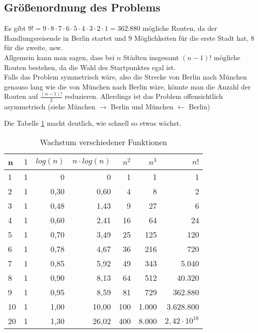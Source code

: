 \documentclass[a4paper,9pt]{scrartcl}
\begin{document}
  \subsection{Größenordnung des Problems}
    Es gibt $9! = 9 \cdot 8 \cdot 7 \cdot 6 \cdot 5 \cdot 4 \cdot 3 \cdot 2 \cdot 1 = 362.880$ mögliche Routen,
    da der Handlungsreisende in Berlin startet und 9 Möglichkeiten für die erste
    Stadt hat, 8 für die zweite, usw.\\
    Allgemein kann man sagen, dass bei $n$ Städten insgesamt $(n-1)!$ mögliche
    Routen bestehen, da die Wahl des Startpunktes egal ist. \\
    Falls das  Problem symmetrisch wäre, also die Strecke von Berlin nach
    München genauso lang wie die von München nach Berlin wäre, könnte man die
    Anzahl der Routen auf $\frac{(n-1)!}{2}$ reduzieren. Allerdings ist das
    Problem offensichtlich asymmetrisch (siehe München $\rightarrow$ Berlin und
    München $\leftarrow$ Berlin)

    Die Tabelle \ref{tab:functionGrowth} macht deutlich, wie schnell so etwas
    wächst.
    \begin{table}[hc]
        \centering
        \begin{tabular}[hc]{|l|r|r|r|r|r|r|}
          \hline
          n         & $1$   & $log(n)$  & $n \cdot log(n)$  & $n^2$ & $n^3$ & $n!$  \\
          \hline\hline
          1         & 1     & 0         & 0                 & 1     &   1   & 1     \\
          2         & 1     & 0,30      & 0,60              & 4     &   8   & 2     \\
          3         & 1     & 0,48      & 1,43              & 9     &   27  & 6     \\
          4         & 1     & 0,60      & 2,41              & 16    &   64  & 24    \\
          5         & 1     & 0,70      & 3,49              & 25    &   125 & 120   \\
          6         & 1     & 0,78      & 4,67              & 36    &   216 & 720   \\
          7         & 1     & 0,85      & 5,92              & 49    &   343 & 5.040 \\
          8         & 1     & 0,90      & 8,13              & 64    &   512 & 40.320\\
          9         & 1     & 0,95      & 8,59              & 81    &   729 & 362.880\\
         10         & 1     & 1,00      & 10,00             & 100   & 1.000 & 3.628.800\\
         20         & 1     & 1,30      & 26,02             & 400   & 8.000 & $2,42 \cdot 10^{18}$ \\
          \hline
        \end{tabular}
        \caption{Wachstum verschiedener Funktionen}
        \label{tab:functionGrowth}
    \end{table}
  \newpage
\end{document}
